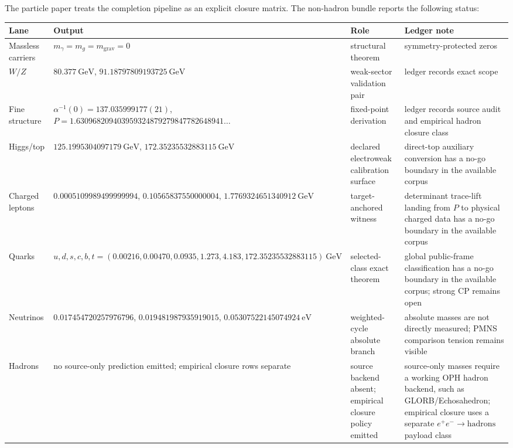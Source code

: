 \documentclass[11pt]{article}
\begin{document}
The particle paper treats the completion pipeline as an explicit closure matrix. The non-hadron
bundle reports the following status:

\begin{table}[h]
\centering
\scriptsize
\setlength{\tabcolsep}{3pt}
\begin{tabular}{@{}>{\raggedright\arraybackslash}p{}>{\raggedright\arraybackslash}p{}>{\raggedright\arraybackslash}p{}>{\raggedright\arraybackslash}p{}@{}}
\toprule
Lane & Output & Role & Ledger note \\
\midrule
Massless carriers & \(m_\gamma=m_g=m_{\mathrm{grav}}=0\) & structural theorem & symmetry-protected zeros \\
\(W/Z\) & \(80.377~\mathrm{GeV}\), \(91.18797809193725~\mathrm{GeV}\) & weak-sector validation pair & ledger records exact scope \\
Fine structure & \(\alpha^{-1}(0)=137.035999177(21)\), \(P=1.630968209403959324879279847782648941\ldots\) & fixed-point derivation & ledger records source audit and empirical hadron closure class \\
Higgs/top & \(125.1995304097179~\mathrm{GeV}\), \(172.35235532883115~\mathrm{GeV}\) & declared electroweak calibration surface & direct-top auxiliary conversion has a no-go boundary in the available corpus \\
Charged leptons & \(0.0005109989499999994\), \(0.10565837550000004\), \(1.7769324651340912~\mathrm{GeV}\) & target-anchored witness & determinant trace-lift landing from \(P\) to physical charged data has a no-go boundary in the available corpus \\
Quarks & \(u,d,s,c,b,t=(0.00216,0.00470,0.0935,1.273,4.183,172.35235532883115)~\mathrm{GeV}\) & selected-class exact theorem & global public-frame classification has a no-go boundary in the available corpus; strong CP remains open \\
Neutrinos & \(0.017454720257976796\), \(0.019481987935919015\), \(0.05307522145074924~\mathrm{eV}\) & weighted-cycle absolute branch & absolute masses are not directly measured; PMNS comparison tension remains visible \\
Hadrons & no source-only prediction emitted; empirical closure rows separate & source backend absent; empirical closure policy emitted & source-only masses require a working OPH hadron backend, such as GLORB/Echosahedron; empirical closure uses a separate \(e^+e^-\to\mathrm{hadrons}\) payload class \\
\bottomrule
\end{tabular}
\end{table}
\end{document}
